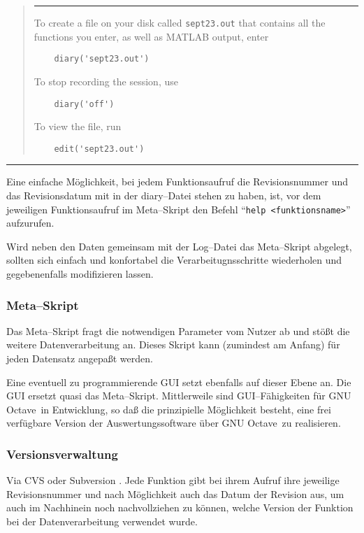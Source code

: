 \documentclass{article}
\def\octave{\textsf{GNU Octave}}
\newcommand{\cmd}[1]{\texttt{#1}}
\newenvironment{Quote}{\begin{quote}\small\vspace*{1em}\hrule\vspace*{1ex}
}{\end{quote}\hrule\vspace*{1em}}
\begin{document}
\begin{Quote}
To create a file on your disk called \texttt{sept23.out} that contains 
all the functions you enter, as well as MATLAB output, enter 
\begin{verbatim} 
    diary('sept23.out') 
\end{verbatim}
To stop recording the session, use 
\begin{verbatim} 
    diary('off') 
\end{verbatim}
To view the file, run 
\begin{verbatim} 
    edit('sept23.out') 
\end{verbatim}
\end{Quote}

Eine einfache Möglichkeit, bei jedem Funktionsaufruf die Revisionsnummer und das
Revisionsdatum mit in der diary--Datei stehen zu haben, ist, vor dem jeweiligen
Funktionsaufruf im Meta--Skript den Befehl ``\cmd{help <funktionsname>}'' aufzurufen.

Wird neben den Daten gemeinsam mit der Log--Datei das Meta--Skript abgelegt,
sollten sich einfach und konfortabel die Verarbeitugnsschritte wiederholen und
gegebenenfalls modifizieren lassen.


\subsubsection{Meta--Skript}

Das Meta--Skript fragt die notwendigen Parameter vom Nutzer ab und stößt die
weitere Datenverarbeitung an. Dieses Skript kann (zumindest am Anfang)
für jeden Datensatz angepaßt werden.

Eine eventuell zu programmierende GUI setzt ebenfalls auf dieser Ebene an. Die
GUI ersetzt quasi das Meta--Skript. Mittlerweile sind GUI--Fähigkeiten für
\octave\ in Entwicklung, so daß die prinzipielle Möglichkeit besteht, eine frei
verfügbare Version der Auswertungssoftware über \octave\ zu realisieren.


\subsubsection{Versionsverwaltung}

Via CVS oder Subversion \cite{Collins-Sussman:2005qs}. Jede Funktion gibt bei 
ihrem Aufruf ihre jeweilige Revisionsnummer und nach Möglichkeit auch das Datum 
der Revision aus, um auch im Nachhinein noch nachvollziehen zu können, welche 
Version der Funktion bei der Datenverarbeitung verwendet wurde.
\end{document}
